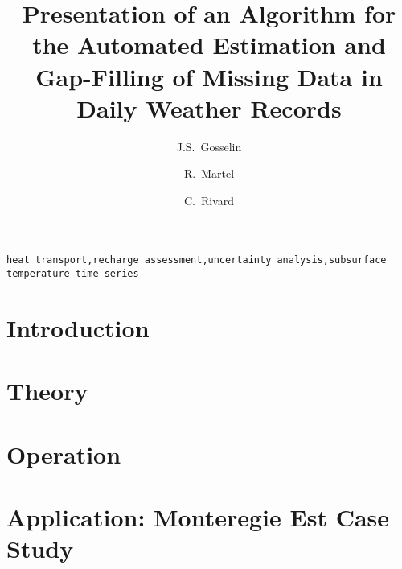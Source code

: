 \documentclass[3p, times, review]{elsarticle} %
\begin{document}
\begin{frontmatter}

\title{Presentation of an Algorithm for the Automated Estimation and Gap-Filling of Missing Data in Daily Weather Records}

\author[inrs]{J.S.~Gosselin}

\author[inrs]{R.~Martel}

\author[cgc]{C.~Rivard}


\address[inrs]{Institut national de la recherche scientifique, Centre Eau Terre Environnement,
490 rue de la Couronne, Quebec City, Quebec, Canada}
\address[cgc]{Geological Survey of Canada, Quebec Division, 490 rue de la Couronne, Quebec City, Quebec, Canada}

\begin{abstract}
	\vspace{-1em}
	
\end{abstract}

\begin{keyword}
\texttt{heat transport\sep recharge assessment\sep uncertainty analysis\sep subsurface temperature time series}
\end{keyword}

\end{frontmatter}

\linenumbers

\section{Introduction}
    

\section{Theory}
    
    
\section{Operation}\label{sec:Howto}
    
    
\section{Application: Monteregie Est Case Study}\label{sec:MontEstCaseStudy}
    
\end{document}

